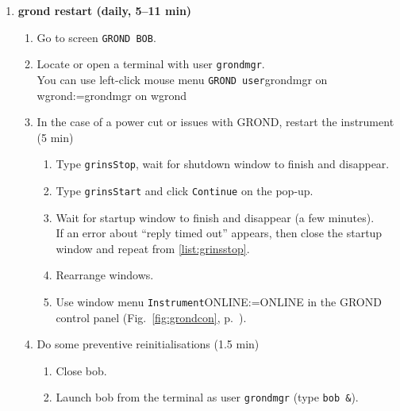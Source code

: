 \documentclass[11pt,fleqn]{book}
\makeatletter
\def\menu#1#2{\texttt{#1}\ifx{}#2\else\@for\@x:=#2\do{$\rightarrow$\texttt{\@x}}\fi}
\def\wmenu#1#2{window menu \menu{#1}{#2}}
\def\mmenu#1#2{left-click mouse menu \menu{#1}{#2}}
\def\figref#1{Fig.~\ref{fig:#1}, p.~\pageref{fig:#1}}
\makeatother
\begin{document}
\begin{enumerate}
\begin{enumerate}
\begin{enumerate}
\begin{enumerate}
              \item Click \texttt{OK} on the error popups, one should say \texttt{error closing w2p2cam}
              \item In \gls{bob}, click on \texttt{Reset status}
              \item Re-run it (point \ref{list:ferostestob}).
            \end{enumerate}
            \item \texttt{FEROS General State} panel, select \wmenu{Telescope}{IGNORE}
           \end{enumerate}
        \end{enumerate}
  \item \textbf{\gls{grond} restart (daily, 5--11 min)}
        \label{list:grond}
        \begin{enumerate}
         \item Go to screen \texttt{GROND BOB}.
         \item Locate or open a terminal with user \texttt{grondmgr}.\\
               You can use \mmenu{GROND user}{grondmgr on \gls{wgrond}}
         \item In the case of a power cut or issues with GROND, restart the instrument (5 min)
         \begin{enumerate}
           \item Type \texttt{grinsStop}, wait for shutdown window to finish and disappear.\label{list:grinsstop}
            \item Type \texttt{grinsStart} and click \texttt{Continue} on the pop-up.
            \item Wait for startup window to finish and disappear (a few minutes).\\If an error about ``reply timed out'' appears, then close the startup window and repeat from \ref{list:grinsstop}.\label{list:grinsstart}
            \item Rearrange windows.
            \item Use \wmenu{Instrument}{ONLINE} in the GROND control panel (\figref{grondcon}).\label{list:grondonline}
         \end{enumerate}
         \item Do some preventive reinitialisations (1.5 min)\label{list:grond-prophylaxis}
           \begin{enumerate}
             \item Close \gls{bob}.
             \item Launch \gls{bob} from the terminal as user \texttt{grondmgr} (type \texttt{bob \&}).

\end{enumerate}
\end{enumerate}
\end{enumerate}
\end{document}
